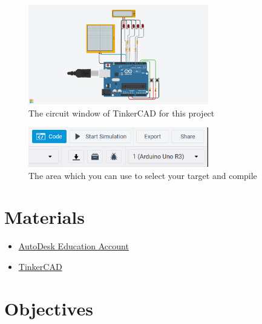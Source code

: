 \documentclass{article}
\begin{document}
        \begin{figure}[ht]
            \centering
            \includegraphics[width = 0.7\textwidth]{images/TinkerCADWires.png}
            \caption{The circuit window of TinkerCAD for this project}
        \end{figure}
        
        \begin{figure}[ht]
            \centering
            \includegraphics[width = 0.7\textwidth]{images/TinkerCadCode.png}
            \caption{The area which you can use to select your target and compile}
        \end{figure}
        
\section{Materials}
\begin{itemize}
	\item \href{https://www.autodesk.com/education/edu-software/overview}{AutoDesk Education Account}
	\item \href{https://www.tinkercad.com/things/aeAzdEiZjZr}{TinkerCAD}
\end{itemize}
\section{Objectives}
\end{document}
